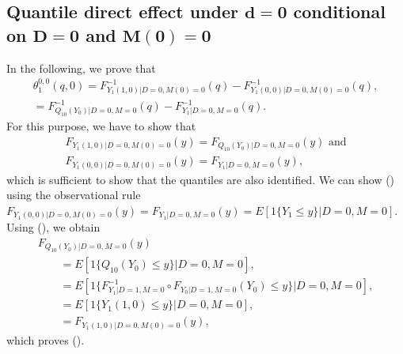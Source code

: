 \documentclass[a4paper,12pt]{article}
\begin{document}
 \doublespacing \pagestyle{plain}
\subsection{Quantile direct effect under $\mathbf{d=0}$ conditional on $\mathbf{D=0}$ and $\mathbf{M(0)=0}$}
In the following, we prove that
\begin{align*}
\theta_1^{0,0}(q,0) = F_{Y_{1}(1,0)|D=0,M(0)=0}^{-1}(q)-F_{Y_{1}(0,0)|D=0,M(0)=0}^{-1}(q),\\= F_{Q_{10}(Y_{0})|D=0,M=0}^{-1}(q)-F_{Y_{1}|D=0,M=0}^{-1}(q).
\end{align*}
For this purpose, we have to show that
\begin{align}
F_{Y_{1}(1,0)|D=0,M(0)=0}(y)   = F_{Q_{10}(Y_{0})|D=0,M=0}(y) \mbox{ and}  \\
F_{Y_{1}(0,0)|D=0,M(0)=0}(y)  =F_{Y_{1}|D=0,M=0}(y) ,
\end{align}
which is sufficient to show that the quantiles are also identified. We can show () using the observational rule $F_{Y_{1}(0,0)|D=0,M(0)=0}(y)= F_{Y_{1}|D=0,M=0}(y)= E[1\{Y_1 \leq y\} |D=0,M=0]$.
Using (), we obtain
\begin{equation*} \begin{array}{rl}
F_{Q_{10}(Y_{0})|D=0,M=0}(y) \\  \qquad = E[1\{Q_{10}(Y_0) \leq y \}|D=0,M=0],\\
\qquad =E[1\{ F_{Y_1|D=1,M=0}^{-1} \circ F_{Y_0|D=1,M=0}(Y_0 ) \leq y \} |D=0,M=0],\\
\qquad =E[1\{ Y_1(1,0)\leq y \}|D=0,M=0],\\
\qquad =F_{Y_{1}(1,0)|D=0,M(0)=0}(y), \end{array}
\end{equation*}
which proves ().
\end{document}
